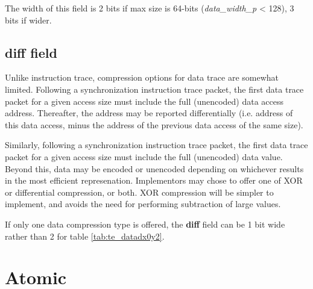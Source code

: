 The width of this field is 2 bits if max size is 64-bits (\textit{data\_width\_p} < 128), 3 bits if wider.

\subsection{diff field} \label{sec:loadstore-diff}

Unlike instruction trace, compression options for data trace are somewhat limited.
Following a synchronization instruction trace packet, the first data trace packet for a given access size must 
include the full (unencoded) data access address.  Thereafter, the address may be reported differentially (i.e. 
address of this data access, minus the address of the previous data access of the same size). 

Similarly, following a synchronization instruction trace packet, the first data trace packet for a given access size 
must include the full (unencoded) data value.  Beyond this, data may be encoded or unencoded depending on whichever
results in the most efficient represenation.  Implementors may chose to offer one of XOR or differential compression,
or both.  XOR compression will be simpler to implement, and avoids the need for performing subtraction of large 
values.

If only one data compression type is offered, the \textbf{diff} field can be 1 bit wide rather than 2 for table \ref{tab:te_datadx0y2}.

\FloatBarrier
\section{Atomic} \label{sec:data-atomic}

